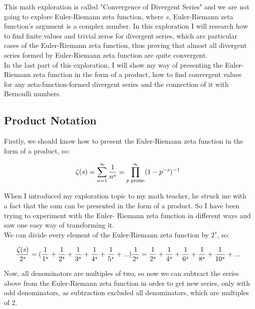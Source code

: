 \documentclass[a4paper]{article}
\begin{document}
This math exploration is called "Convergence of Divergent Series" and we are not going to explore
Euler-Riemann zeta function, where $s$, Euler-Riemann zeta function's argument is a complex
number. In this exploration I will research how to find finite values and trivial zeros for divergent
series, which are particular cases of the Euler-Riemann zeta function, thus proving that almost all
divergent series formed by Euler-Riemann zeta function are quite convergent.\\

In the last part of this exploration, I will show my way of presenting the Euler-Riemann zeta
function in the form of a product, how to find convergent values for any zeta-function-formed
divergent series and the connection of it with Bernoulli numbers.

\subsection{Product Notation}

Firstly, we should know how to present the Euler-Riemann zeta function in the form of a product,
so:

\begin{equation}
  \zeta(s)=\sum_{n=1}^{\infty} \frac{1}{n^s}=\prod_{p \text{ prime}}^{\infty} (1-p^{-s})^{-1}\\
\end{equation}

When I introduced my exploration topic to my math teacher, he struck me with a fact that the sum
can be presented in the form of a product. So I have been trying to experiment with the Euler-
Riemann zeta function in different ways and saw one easy way of transforming it.\\

We can divide every element of the Euler-Riemann zeta function by $2^s$, so:

\begin{equation*}
  \frac{\zeta(s)}{2^s}= (\frac{1}{1^s}+\frac{1}{2^s}+\frac{1}{3^s}+
  \frac{1}{4^s}+\frac{1}{5^s}+...)\frac{1}{2^s}=
  \frac{1}{2^s}+\frac{1}{4^s}+\frac{1}{6^s}+
  \frac{1}{8^s}+\frac{1}{10^s}+...\\
  \end{equation*}

Now, all denominators are multiples of two, so now we can subtract the series above from the
Euler-Riemann zeta function in order to get new series, only with odd denominators, as subtraction
excluded all denominators, which are multiples of 2.
\end{document}
